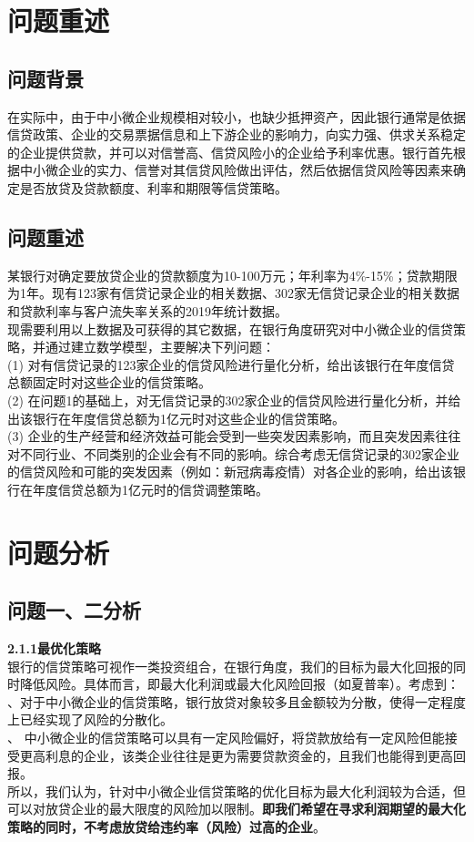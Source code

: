 \documentclass[bwprint]{cumcm}
\begin{document}
\section{\heiti 问题重述}
\subsection{问题背景}
在实际中，由于中小微企业规模相对较小，也缺少抵押资产，因此银行通常是依据信贷政策、企业的交易票据信息和上下游企业的影响力，向实力强、供求关系稳定的企业提供贷款，并可以对信誉高、信贷风险小的企业给予利率优惠。银行首先根据中小微企业的实力、信誉对其信贷风险做出评估，然后依据信贷风险等因素来确定是否放贷及贷款额度、利率和期限等信贷策略。
\subsection{问题重述}
某银行对确定要放贷企业的贷款额度为10-100万元；年利率为4\%-15\%；贷款期限为1年。现有123家有信贷记录企业的相关数据、302家无信贷记录企业的相关数据和贷款利率与客户流失率关系的2019年统计数据。\\
 \indent 现需要利用以上数据及可获得的其它数据，在银行角度研究对中小微企业的信贷策略，并通过建立数学模型，主要解决下列问题：\\
 \indent(1) 对有信贷记录的123家企业的信贷风险进行量化分析，给出该银行在年度信贷总额固定时对这些企业的信贷策略。\\
 \indent(2) 在问题1的基础上，对无信贷记录的302家企业的信贷风险进行量化分析，并给出该银行在年度信贷总额为1亿元时对这些企业的信贷策略。\\
 \indent(3) 企业的生产经营和经济效益可能会受到一些突发因素影响，而且突发因素往往对不同行业、不同类别的企业会有不同的影响。综合考虑无信贷记录的302家企业的信贷风险和可能的突发因素（例如：新冠病毒疫情）对各企业的影响，给出该银行在年度信贷总额为1亿元时的信贷调整策略。\\






\section{\heiti 问题分析}
\subsection{\heiti 问题一、二分析}
\noindent \textbf{2.1.1最优化策略}\\
\indent 银行的信贷策略可视作一类投资组合，在银行角度，我们的目标为最大化回报的同时降低风险。具体而言，即最大化利润或最大化风险回报（如夏普率）。考虑到：\\
  、对于中小微企业的信贷策略，银行放贷对象较多且金额较为分散，使得一定程度上已经实现了风险的分散化。\\
  、  中小微企业的信贷策略可以具有一定风险偏好，将贷款放给有一定风险但能接受更高利息的企业，该类企业往往是更为需要贷款资金的，且我们也能得到更高回报。\\
  \indent  所以，我们认为，针对中小微企业信贷策略的优化目标为最大化利润较为合适，但可以对放贷企业的最大限度的风险加以限制。\textbf{即我们希望在寻求利润期望的最大化策略的同时，不考虑放贷给违约率（风险）过高的企业}。\\
  
\end{document}
